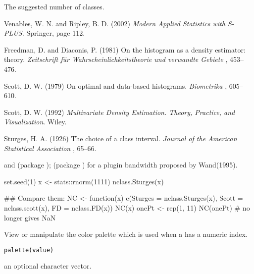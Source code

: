%
\begin{Value}
The suggested number of classes.
\end{Value}
%
\begin{References}\relax
Venables, W. N. and Ripley, B. D. (2002)
\emph{Modern Applied Statistics with S-PLUS.}
Springer, page 112.

Freedman, D. and Diaconis, P. (1981)
On the histogram as a density estimator:  theory.
\emph{Zeitschrift für Wahrscheinlichkeitstheorie
und verwandte Gebiete} , 453--476.

Scott, D. W. (1979) On optimal and data-based histograms.
\emph{Biometrika} , 605--610.

Scott, D. W. (1992)
\emph{Multivariate Density Estimation. Theory, Practice, and
Visualization}. Wiley.

Sturges, H. A. (1926)  The choice of a class interval.
\emph{Journal of the American Statistical Association} , 65--66.
\end{References}
%
\begin{SeeAlso}\relax
{} and  (package
);   (package
) for a plugin bandwidth proposed by Wand(1995).
\end{SeeAlso}
%
\begin{Examples}
\begin{ExampleCode}
set.seed(1)
x <- stats::rnorm(1111)
nclass.Sturges(x)

## Compare them:
NC <- function(x) c(Sturges = nclass.Sturges(x),
      Scott = nclass.scott(x), FD = nclass.FD(x))
NC(x)
onePt <- rep(1, 11)
NC(onePt) # no longer gives NaN
\end{ExampleCode}
\end{Examples}
%
\begin{Description}\relax
View or manipulate the color palette which is used when a 
has a numeric index.
\end{Description}
%
\begin{Usage}
\begin{verbatim}
palette(value)
\end{verbatim}
\end{Usage}
%
\begin{Arguments}
\begin{ldescription}
\item[\code{value}] an optional character vector.
\end{ldescription}
\end{Arguments}

